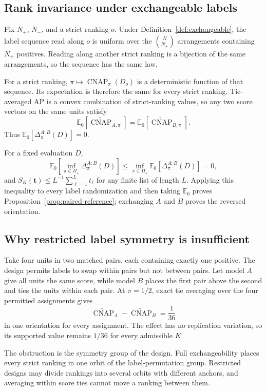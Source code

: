 \documentclass[11pt]{article}
\newcommand{\CNAP}{\operatorname{CNAP}}
\newcommand{\PSet}{\Pi_\star}
\newcommand{\E}{\mathbb{E}}
\newcommand{\CNAPta}{\widetilde{\CNAP}}
\theoremstyle{remark}
\begin{document}
\subsection{Rank invariance under exchangeable labels}

Fix $N_+$, $N_-$, and a strict ranking $o$. Under Definition~\ref{def:exchangeable}, the label sequence read along $o$ is uniform over the $\binom N{N_+}$ arrangements containing $N_+$ positives. Reading along another strict ranking is a bijection of the same arrangements, so the sequence has the same law.

For a strict ranking, $\pi\mapsto\CNAP_\pi(D_o)$ is a deterministic function of that sequence. Its expectation is therefore the same for every strict ranking. Tie-averaged AP is a convex combination of strict-ranking values, so any two score vectors on the same units satisfy
\[
\E_0[\CNAPta_{A,\pi}]
=
\E_0[\CNAPta_{B,\pi}].
\]
Thus $\E_0[\Delta^{A:B}_\pi(D)]=0$.

For a fixed evaluation $D$,
\[
\E_0\!\left[
\inf_{\pi\in\PSet}\Delta^{A:B}_\pi(D)
\right]
\leq
\inf_{\pi\in\PSet}\E_0[\Delta^{A:B}_\pi(D)]
=0,
\]
and $S_K(\mathbf t)\leq L^{-1}\sum_{\ell=1}^Lt_\ell$ for any finite list of length $L$. Applying this inequality to every label randomization and then taking $\E_0$ proves Proposition~\ref{prop:paired-reference}; exchanging $A$ and $B$ proves the reversed orientation.

\subsection{Why restricted label symmetry is insufficient}

Take four units in two matched pairs, each containing exactly one positive. The design permits labels to swap within pairs but not between pairs. Let model $A$ give all units the same score, while model $B$ places the first pair above the second and ties the units within each pair. At $\pi=1/2$, exact tie averaging over the four permitted assignments gives
\[
\CNAPta_A-\CNAPta_B
=
\frac1{36}
\]
in one orientation for every assignment. The effect has no replication
variation, so its supported value remains $1/36$ for every admissible $K$.

The obstruction is the symmetry group of the design. Full exchangeability places every strict ranking in one orbit of the label-permutation group. Restricted designs may divide rankings into several orbits with different anchors, and averaging within score ties cannot move a ranking between them.
\end{document}
